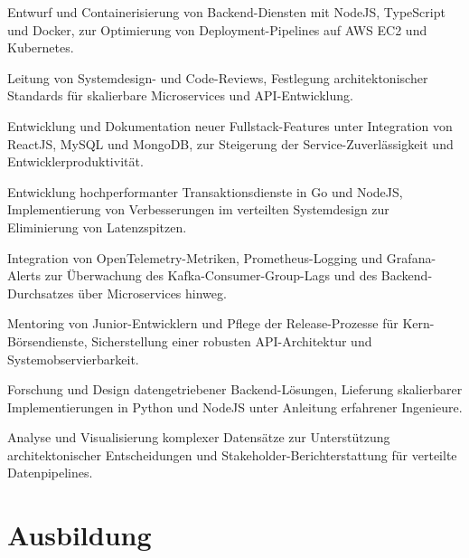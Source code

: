 \documentclass[10pt,a4paper]{resume}
\begin{document}
\bullets
  \item Entwurf und Containerisierung von Backend-Diensten mit NodeJS, TypeScript und Docker, zur Optimierung von Deployment-Pipelines auf AWS EC2 und Kubernetes.
  \item Leitung von Systemdesign- und Code-Reviews, Festlegung architektonischer Standards für skalierbare Microservices und API-Entwicklung.
  \item Entwicklung und Dokumentation neuer Fullstack-Features unter Integration von ReactJS, MySQL und MongoDB, zur Steigerung der Service-Zuverlässigkeit und Entwicklerproduktivität.
\bulletsend
\vspace{1.5pt}
\bullets
  \item Entwicklung hochperformanter Transaktionsdienste in Go und NodeJS, Implementierung von Verbesserungen im verteilten Systemdesign zur Eliminierung von Latenzspitzen.
  \item Integration von OpenTelemetry-Metriken, Prometheus-Logging und Grafana-Alerts zur Überwachung des Kafka-Consumer-Group-Lags und des Backend-Durchsatzes über Microservices hinweg.
  \item Mentoring von Junior-Entwicklern und Pflege der Release-Prozesse für Kern-Börsendienste, Sicherstellung einer robusten API-Architektur und Systemobservierbarkeit.
\bulletsend
\vspace{1.5pt}
\bullets
  \item Forschung und Design datengetriebener Backend-Lösungen, Lieferung skalierbarer Implementierungen in Python und NodeJS unter Anleitung erfahrener Ingenieure.
  \item Analyse und Visualisierung komplexer Datensätze zur Unterstützung architektonischer Entscheidungen und Stakeholder-Berichterstattung für verteilte Datenpipelines.
\bulletsend
\vspace{1.5pt}

\section{Ausbildung}

\vspace{2pt}
\end{document}
